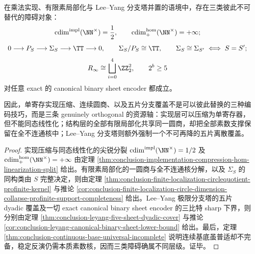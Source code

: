 \begin{theorem}\label{thm:conclusion-phase-ledger-circle-sheet-nonexchangeable-triple-obstruction}
在乘法实现、有限素局部化与 Lee--Yang 分支塔并置的语境中，存在三类彼此不可替代的障碍对象：
\[
\mathrm{cdim}^{\mathrm{impl}}(\NN^\times)=\frac12,
\qquad
\mathrm{cdim}^{\mathrm{hom}}_+(\NN^\times)=+\infty;
\]
\[
0\longrightarrow P_S\longrightarrow \Sigma_S\longrightarrow \TT\longrightarrow 0,
\qquad
\Sigma_S/P_S\cong \TT,
\qquad
\Sigma_S\cong \Sigma_{S'}\iff S=S';
\]
\[
R_\infty\cong \bigsqcup_{i=0}^{4}\ZZ_2^2,
\qquad
2^b\ge 5
\]
对任意 exact 的 canonical binary sheet encoder 都成立。

因此，单寄存实现压缩、连续圆商、以及五片分支覆盖不是可以彼此替换的三种编码技巧，而是三条 genuinely orthogonal 的资源轴：实现层可以压缩为单寄存器，但不能同态线性化；结构层的全部有限局部化共享同一圆商，却把全部素数支撑保留在全不连通核中；Lee--Yang 分支塔则额外强制一个不可再降的五片离散覆盖。
\end{theorem}
\begin{proof}
实现压缩与同态线性化的尖锐分裂
\(
\mathrm{cdim}^{\mathrm{impl}}(\NN^\times)=1/2
\)
及
\(
\mathrm{cdim}^{\mathrm{hom}}_+(\NN^\times)=+\infty
\)
由定理 \ref{thm:conclusion-implementation-compression-hom-linearization-split} 给出。有限素局部化的一圆商与全不连通核分解，以及 \(\Sigma_S\) 的同构类由 \(S\) 完整决定，则由定理 \ref{thm:conclusion-finite-localization-circlequotient-profinite-kernel} 与推论 \ref{cor:conclusion-finite-localization-circle-dimension-collapse-profinite-support-completeness} 给出。Lee--Yang 极限分支塔的五片 dyadic 覆盖及一切 exact canonical binary sheet encoder 的三比特 sharp 下界，则分别由定理 \ref{thm:conclusion-leyang-five-sheet-dyadic-cover} 与推论 \ref{cor:conclusion-leyang-canonical-binary-sheet-lower-bound} 给出。最后，定理 \ref{thm:conclusion-continuous-base-universal-incomplete} 说明连续基底虽普适却不完备，稳定反演仍需本质素数核，因而三类障碍确属不同层级。证毕。
\end{proof}

